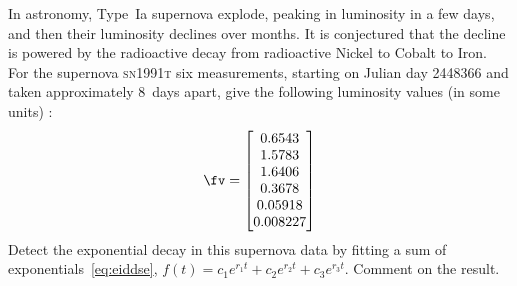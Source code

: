 \begin{exercise} \label{ex:} 
In astronomy, Type~Ia supernova explode, peaking in luminosity in a few days, and then their luminosity declines over months. 
It is conjectured that the decline is powered by the radioactive decay from radioactive Nickel to Cobalt to Iron.
For the supernova \textsc{sn1991t} six measurements, starting on Julian day 2448366 and taken approximately 8~days apart, give the following luminosity values (in some units) \cite[p.146]{Pereyra2010}:
\setbox\ajrqrbox\hbox{}\marginpar{\usebox{\ajrqrbox}}%
\begin{equation*}
\fv=\begin{bmatrix} 0.6543
\\ 1.5783
\\ 1.6406
\\ 0.3678
\\ 0.05918
\\ 0.008227 \end{bmatrix}
\end{equation*}
Detect the exponential decay in this supernova data by fitting a sum of exponentials~\eqref{eq:eiddse}, \(f(t)=c_1e^{r_1t}+c_2e^{r_2t}+c_3e^{r_3t}\).
Comment on the result.
\end{exercise}




